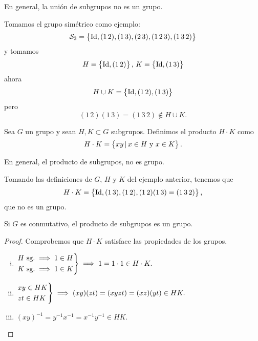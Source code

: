 \begin{obs}
    En general, la unión de subgrupos no es un grupo.
\end{obs}

\begin{example}
    Tomamos el grupo simétrico como ejemplo:
    \[
        \mathcal{S}_3 = \left\{ \operatorname{Id}, (1 \, 2), (1 \, 3), (2 \, 3), (1 \, 2 \, 3), (1 \, 3 \, 2)\right\}
    \]
    y tomamos
    \[
        H = \left\{\operatorname{Id}, (1 \, 2)\right\}, \, K = \left\{\operatorname{Id}, (1 \, 3)\right\}
    \]
    ahora
    \[
        H \cup K = \left\{\operatorname{Id}, (1 \, 2), (1\, 3)\right\}
    \]
    pero
    \[
        (1 \, 2)(1 \, 3) = (1 \, 3 \, 2) \notin H \cup K.
    \]
\end{example}

\begin{defi}
    Sea $G$ un grupo y sean $H, K \subset G$ subgrupos. Definimos el producto $H \cdot K$ como
    \[
        H \cdot K = \left\{xy \,\vert\, x \in H \text{ y } x \in K\right\}.
    \]
\end{defi}

\begin{obs}
    En general, el producto de subgrupos, no es grupo.
\end{obs}

\begin{example}
    Tomando las definiciones de $G$, $H$ y $K$ del ejemplo anterior, tenemos que
    \[
        H \cdot K = \left\{\operatorname{Id}, (1 \, 3), (1 \, 2), (1 \, 2)(1 \, 3) = (1 \, 3 \, 2)\right\},
    \]
    que no es un grupo.
\end{example}

\begin{obs}
    Si $G$ es conmutativo, el producto de subgrupos es un grupo.
\end{obs}

\begin{proof}
    Comprobemos que $H \cdot K$ satisface las propiedades de los grupos.
    \begin{enumerate}[i)]
        \item 
            $
                \begin{rcases}
                    H \text{ sg.} \implies 1 \in H \\
                    K \text{ sg.} \implies 1 \in K
                \end{rcases}
                \implies 1 = 1\cdot 1 \in H \cdot K.
            $
        \item
            $
                \begin{rcases}
                    xy \in HK \\
                    zt \in HK
                \end{rcases}
                \implies (xy)(zt) = (xyzt) = (xz)(yt) \in HK.
            $
        \item
            $
                (xy)^{-1} = y^{-1} x^{-1} = x^{-1}y^{-1} \in HK.
            $
    \end{enumerate}
\end{proof}

